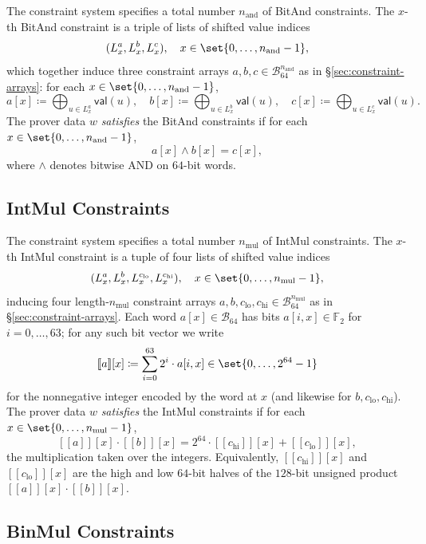 \documentclass{article}
\theoremstyle{definition}
\newcommand{\BB}{\mathcal{B}}
\newcommand{\FF}[1]{\mathbb{F}_{#1}}
\newcommand{\intval}[1]{[\![#1]\!]}
\begin{document}
The constraint system specifies a total number $n_\text{and}$ of BitAnd constraints. The $x$-th BitAnd constraint is a triple of lists of shifted value indices
\[
  (L^a_x, L^b_x, L^c_x), \quad x \in \set{0, \ldots, n_\text{and} - 1},
\]
which together induce three constraint arrays $a, b, c \in \BB_{64}^{n_\text{and}}$ as in \S\ref{sec:constraint-arrays}: for each $x \in \set{0, \ldots, n_\text{and} - 1}$,
\[
  a[x] \coloneqq \bigoplus_{u \in L^a_x} \textsf{val}(u), \quad
  b[x] \coloneqq \bigoplus_{u \in L^b_x} \textsf{val}(u), \quad
  c[x] \coloneqq \bigoplus_{u \in L^c_x} \textsf{val}(u).
\]
The prover data $w$ \emph{satisfies} the BitAnd constraints if for each $x \in \set{0, \ldots, n_\text{and} - 1}$,
\[
  a[x] \land b[x] = c[x],
\]
where $\land$ denotes bitwise AND on $64$-bit words.

\subsection{IntMul Constraints}
\label{sec:intmul-constraints}

The constraint system specifies a total number $n_\text{mul}$ of IntMul constraints. The $x$-th IntMul constraint is a tuple of four lists of shifted value indices
\[
  (L^a_x, L^b_x, L^{c_\text{lo}}_x, L^{c_\text{hi}}_x), \quad x \in \set{0, \ldots, n_\text{mul} - 1},
\]
inducing four length-$n_\text{mul}$ constraint arrays $a, b, c_\text{lo}, c_\text{hi} \in \BB_{64}^{n_\text{mul}}$ as in \S\ref{sec:constraint-arrays}. Each word $a[x] \in \BB_{64}$ has bits $a[i, x] \in \FF{2}$ for $i = 0, \ldots, 63$; for any such bit vector we write
\[
  \intval{a}[x] \coloneqq \sum_{i = 0}^{63} 2^i \cdot a[i, x] \in \set{0, \ldots, 2^{64} - 1}
\]
for the nonnegative integer encoded by the word at $x$ (and likewise for $b, c_\text{lo}, c_\text{hi}$). The prover data $w$ \emph{satisfies} the IntMul constraints if for each $x \in \set{0, \ldots, n_\text{mul} - 1}$,
\[
  \intval{a}[x] \cdot \intval{b}[x] = 2^{64} \cdot \intval{c_\text{hi}}[x] + \intval{c_\text{lo}}[x],
\]
the multiplication taken over the integers. Equivalently, $\intval{c_\text{hi}}[x]$ and $\intval{c_\text{lo}}[x]$ are the high and low $64$-bit halves of the $128$-bit unsigned product $\intval{a}[x] \cdot \intval{b}[x]$.

\subsection{BinMul Constraints}
\label{sec:binmul-constraints}
\end{document}
